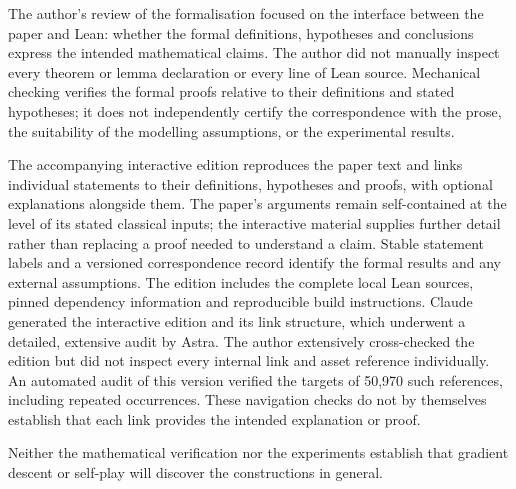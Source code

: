 \documentclass[11pt]{article}
\theoremstyle{plain}
\theoremstyle{definition}
\theoremstyle{remark}
\numberwithin{equation}{section}
\begin{document}
The author's review of the formalisation focused on the interface between the paper and Lean: whether the formal definitions, hypotheses and conclusions express the intended mathematical claims. The author did not manually inspect every theorem or lemma declaration or every line of Lean source. Mechanical checking verifies the formal proofs relative to their definitions and stated hypotheses; it does not independently certify the correspondence with the prose, the suitability of the modelling assumptions, or the experimental results.

The accompanying interactive edition \cite{riis2026interactive} reproduces the paper text and links individual statements to their definitions, hypotheses and proofs, with optional explanations alongside them. The paper's arguments remain self-contained at the level of its stated classical inputs; the interactive material supplies further detail rather than replacing a proof needed to understand a claim. Stable statement labels and a versioned correspondence record identify the formal results and any external assumptions. The edition includes the complete local Lean sources, pinned dependency information and reproducible build instructions. Claude generated the interactive edition and its link structure, which underwent a detailed, extensive audit by Astra. The author extensively cross-checked the edition but did not inspect every internal link and asset reference individually. An automated audit of this version verified the targets of 50,970 such references, including repeated occurrences. These navigation checks do not by themselves establish that each link provides the intended explanation or proof.

Neither the mathematical verification nor the experiments establish that gradient descent or self-play will discover the constructions in general.

\end{document}
